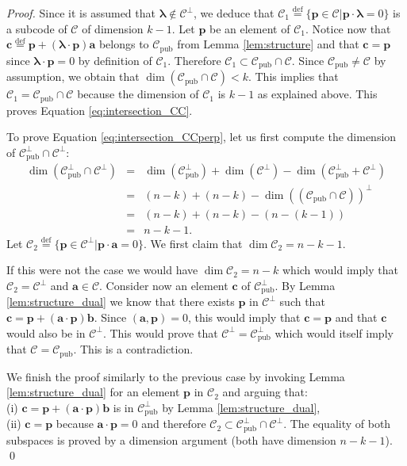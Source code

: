 \documentclass[runningheads,11pt]{llncs}
\newcommand{\eqdef}{\stackrel{\text{def}}{=}}
\newcommand{\code}[1]{\ensuremath{\mathscr{#1}}}
\newcommand{\Cpub}{\code{C}_{\text{pub}}}
\newcommand{\CC}{\code{C}}
\newcommand{\scp}[2]{#1\cdot #2}
\newcommand{\word}[1]{\ensuremath{\boldsymbol{#1}}}
\newcommand{\av}{\word{a}}
\newcommand{\bv}{\word{b}}
\newcommand{\lambdav}{\word{\lambda}}
\newcommand{\cv}{\word{c}}
\newcommand{\pv}{\word{p}}
\begin{document}
\begin{proof}
Since it is assumed that $\lambdav \notin \CC^\perp$, we deduce that
$\CC_1 \eqdef \{\pv \in \CC | \scp{\pv}{\lambdav}=0\}$ is a subcode of $\CC$
of dimension $k-1$. Let $\pv$ be an element of $\CC_1$. Notice now that 
$\cv \eqdef \pv + (\scp{\lambdav}{\pv})\av$ belongs to $\Cpub$ from Lemma \ref{lem:structure} and
that  $\cv= \pv$ since $\scp{\lambdav}{\pv}=0$ by definition of $\CC_1$. Therefore $\CC_1 \subset \Cpub \cap \CC$.
Since $\Cpub \neq \CC$ by assumption, we obtain that $\dim\left( \Cpub \cap \CC \right)<k$. 
This implies that $\CC_1 = \Cpub \cap \CC$ because the dimension of $\CC_1$ is $k-1$ as explained above.
This proves Equation \eqref{eq:intersection_CC}. 

To prove Equation  \eqref{eq:intersection_CCperp}, let us first compute the
dimension of $\Cpub^\perp \cap \CC^\perp$:
\begin{eqnarray}
\dim(\Cpub^\perp \cap \CC^\perp) & = & \dim(\Cpub^\perp) + \dim( \CC^\perp) - \dim(\Cpub^\perp + \CC^\perp)\\
& = & (n-k) +(n-k) - \dim\left((\Cpub \cap \CC)\right)^\perp \\
& = & (n-k) +(n-k)-(n-(k-1))\\
& = &n-k-1.
\end{eqnarray}
Let  $\CC_2 \eqdef\{\pv \in \CC^\perp | \scp{\pv}{\av}=0\}$. We first claim that $\dim \CC_2=n-k-1$. 

If this were not the case we would have $\dim \CC_2=n-k$ which would imply that
$\CC_2=\CC^\perp$ and $\av \in \CC$. Consider now an element $\cv$ of $\Cpub^\perp$. By Lemma
\ref{lem:structure_dual} we know that there exists $\pv$ in $\CC^\perp$ such that
$\cv = \pv + (\scp{\av}{\pv}) \bv$. Since $(\av,\pv)=0$, this would imply that $\cv=\pv$ and 
that $\cv$ would also be in $\CC^\perp$. This would prove that $\CC^\perp=\Cpub^\perp$ which would itself 
imply that $\CC=\Cpub$. This is a contradiction.

We finish the proof similarly to the previous case by invoking Lemma \ref{lem:structure_dual} for an element
$\pv$ in $\CC_2$ and arguing that:\\
(i) $\cv=\pv+(\scp{\av}{\pv}) \bv$ is in $\Cpub^\perp$ by Lemma \ref{lem:structure_dual},\\
(ii) $\cv=\pv$ because $\scp{\av}{\pv} =0$ and therefore $\CC_2 \subset \Cpub^\perp \cap \CC^\perp$.
The equality of both subspaces is proved by a dimension argument (both have dimension $n-k-1$).
\qed
\end{proof}
\end{document}
